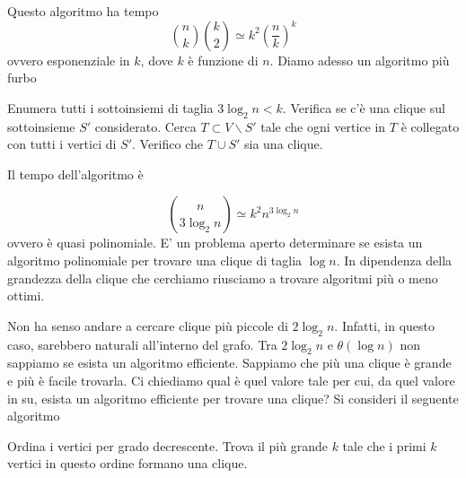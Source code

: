 \documentclass[12pt]{report}
\begin{document}
\noindent 
Questo algoritmo ha tempo $$\binom{n}{k}\binom{k}{2} \simeq k^2 (\frac{n}{k})^k$$
ovvero esponenziale in $k$, dove $k$ è funzione di $n$. Diamo adesso un algoritmo più furbo

\begin{algorithm}[H]
\caption{}\label{euclid}
\begin{algorithmic}[1]
\State Enumera tutti i sottoinsiemi di taglia $3\log_2 n < k$.
\State Verifica se c'è una clique sul sottoinsieme $S'$ considerato.
\State Cerca $T\subset V \backslash S'$ tale che ogni vertice in $T$ è collegato con tutti i vertici di $S'$.
\State Verifico che $T \cup S'$ sia una clique.
\end{algorithmic}
\end{algorithm}

\noindent 
Il tempo dell'algoritmo è 

$$\binom{n}{3\log_2n} \simeq k^2 n^{3\log_2n}$$
ovvero è quasi polinomiale. E' un problema aperto determinare se esista un algoritmo polinomiale per trovare una clique di taglia $\log n$. 
In dipendenza della grandezza della clique che cerchiamo riusciamo a trovare algoritmi più o meno ottimi. 

Non ha senso andare a cercare clique più piccole di $2\log_2n$. Infatti, in questo caso, sarebbero naturali all'interno del grafo. Tra $2\log_2n$ e $\theta (\log n)$ non sappiamo se esista un algoritmo efficiente. Sappiamo che più una clique è grande e più è facile trovarla. Ci chiediamo qual è quel valore tale per cui, da quel valore in su, esista un algoritmo efficiente per trovare una clique?
Si consideri il seguente algoritmo


\begin{algorithm}[H]
\caption{}\label{euclid}
\begin{algorithmic}[1]
\State Ordina i vertici per grado decrescente.
\State Trova il più grande $k$ tale che i primi $k$ vertici in questo ordine formano una clique.
\end{algorithmic}
\end{algorithm}
\end{document}
